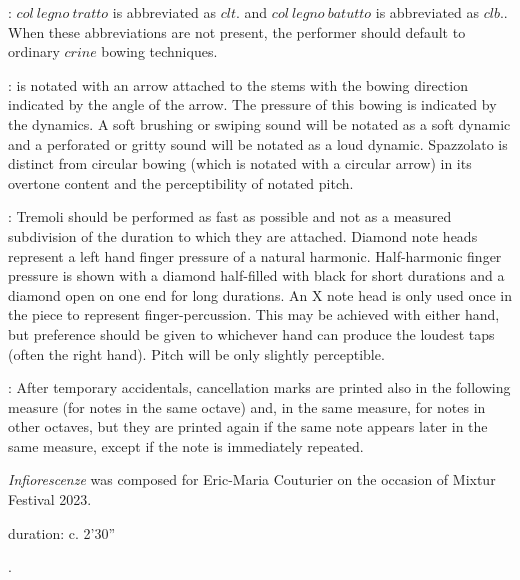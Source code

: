 \documentclass[11pt]{article}
\newcommand*\circled[1]{\tikz[baseline=(char.base)]{
            \node[shape=circle,draw,inner sep=1pt] (char) {#1};}}
\begin{document}
 : \circled{1} $col \ legno \ tratto$ is abbreviated as $clt.$ and \circled{2} $col \ legno \ batutto$ is abbreviated as $clb.$. When these abbreviations are not present, the performer should default to ordinary $crine$ bowing techniques.
\rightskip\leftskip
\phantom{text} \hfill \phantom{()}

 : is notated with an arrow attached to the stems with the bowing direction indicated by the angle of the arrow. The pressure of this bowing is indicated by the dynamics. A soft brushing or swiping sound will be notated as a soft dynamic and a perforated or gritty sound will be notated as a loud dynamic. Spazzolato is distinct from circular bowing (which is notated with a circular arrow) in its overtone content and the perceptibility of notated pitch.
\rightskip\leftskip
\phantom{text} \hfill \phantom{()}

 : \circled{1} Tremoli should be performed as fast as possible and not as a measured subdivision of the duration to which they are attached. \circled{2} Diamond note heads represent a left hand finger pressure of a natural harmonic. \circled{3} Half-harmonic finger pressure is shown with a diamond half-filled with black for short durations and a diamond open on one end for long durations. \circled{4} An X note head is only used once in the piece to represent finger-percussion. This may be achieved with either hand, but preference should be given to whichever hand can produce the loudest taps (often the right hand). Pitch will be only slightly perceptible.
\rightskip\leftskip
\phantom{text} \hfill \phantom{()}

 : After temporary accidentals, cancellation marks are printed also in the following measure (for notes in the same octave) and, in the same measure, for notes in other octaves, but they are printed again if the same note appears later in the same measure, except if the note is immediately repeated.
\rightskip\leftskip
\phantom{text} \hfill \phantom{()}

\vspace*{15\baselineskip}

\begin{center}
\textit{Infiorescenze} was composed for Eric-Maria Couturier on the occasion of Mixtur Festival 2023.
\end{center}

\vspace*{10\baselineskip}

\begin{center}
duration: c. 2'30''
\end{center}

\vspace*{10\baselineskip}
.
\end{document}
